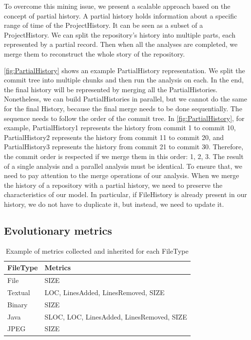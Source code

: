 To overcome this mining issue, we present a scalable approach based on the concept of partial history.
A partial history holds information about a specific range of time of the ProjectHistory. 
It can be seen as a subset of a ProjectHistory. 
We can split the repository's history into multiple parts, each represented by a partial record. Then when all the analyses are completed, we merge them to reconstruct the whole story of the repository.


\autoref{fig:PartialHistory} shows an example PartialHistory representation. 
We split the commit tree into multiple chunks and then run the analysis on each. 
In the end, the final history will be represented by merging all the PartialHistories. 
Nonetheless, we can build PartialHistories in parallel, but we cannot do the same for the final History, 
because the final merge needs to be done sequentially. The sequence needs to follow the order of the commit tree. 
In \autoref{fig:PartialHistory}, for example,
PartialHistory1 represents the history from commit 1 to commit 10, 
PartialHistory2 represents the history from commit 11 to commit 20, and 
PartialHistory3 represents the history from commit 21 to commit 30.
Therefore, the commit order is respected if we merge them in this order: 1, 2, 3. 
The result of a single analysis and a parallel analysis must be identical. 
To ensure that, we need to pay attention to the merge operations of our analysis.
When we merge the history of a repository with a partial history, we need to preserve the characteristics of our model. 
In particular, if FileHistory is already present in our history, we do not have to duplicate it, but instead, we need to update it. 
\label{s:evolutionaryMetrics}
\subsection*{Evolutionary metrics}

\begin{table}[ht]
    \centering
        \begin{tabular}{@{}ll@{}} 
        \toprule
        \textbf{FileType} & \textbf{Metrics} \\\midrule
        File    & SIZE      \\
        Textual & LOC, LinesAdded, LinesRemoved, SIZE \\
        Binary  & SIZE         \\
        Java    & SLOC, LOC, LinesAdded, LinesRemoved, SIZE \\
        JPEG    & SIZE \\\bottomrule
    \end{tabular}
    \caption{Example of metrics collected and inherited for each FileType}
    \label{table:metricsT}
\end{table}

